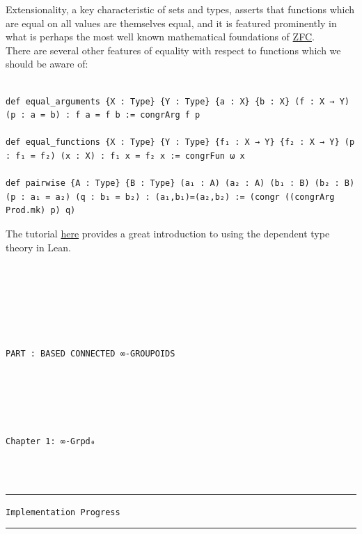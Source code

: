 \documentclass{book}
\theoremstyle{definition}
\newcounter{pcounter}
\newcounter{lcounter}
\renewcommand{\chapter}[1]{
\newpage
{
\Huge 
\begin{center}
\ \\
\ \\
\thispagestyle{empty}
\texttt{#1}
\end{center}}
\ \\
\ \\
}
\newcounter{partcount}
\renewcommand{\part}[1]{
\newpage
{
\Huge 
\begin{center}
\ \\
\ \\
\ \\
\ \\
\ \\
\ \\
\thispagestyle{empty}
\texttt{PART {\thepartcount}: #1}
\stepcounter{partcount}
\end{center}}
\ \\
\ \\
}
\begin{document}
Extensionality, a key characteristic of sets and types, asserts that functions which are equal on all values are themselves equal, and it is featured prominently in what is perhaps the most well known mathematical foundations of \href{https://encyclopediaofmath.org/wiki/ZFC}{ZFC}.\\

There are several other features of equality with respect to functions which we should be aware of:

\begin{center}
\begin{tcolorbox}[width=5in,colback={white},title={\begin{center}\texttt{Lean \thelcounter} \addtocounter{lcounter}{1}  \end{center}},colbacktitle=Blue,coltitle=black]
\begin{verbatim}

def equal_arguments {X : Type} {Y : Type} {a : X} {b : X} (f : X → Y) (p : a = b) : f a = f b := congrArg f p

def equal_functions {X : Type} {Y : Type} {f₁ : X → Y} {f₂ : X → Y} (p : f₁ = f₂) (x : X) : f₁ x = f₂ x := congrFun ω x

def pairwise {A : Type} {B : Type} (a₁ : A) (a₂ : A) (b₁ : B) (b₂ : B) (p : a₁ = a₂) (q : b₁ = b₂) : (a₁,b₁)=(a₂,b₂) := (congr ((congrArg Prod.mk) p) q)

\end{verbatim}
\end{tcolorbox}
\end{center}

The tutorial \href{https://leanprover.github.io/theorem_proving_in_lean4/}{here} provides a great introduction to using the dependent type theory in Lean.\\


\part{BASED CONNECTED ∞-GROUPOIDS}



\chapter{Chapter 1: ∞\texttt{-Grpd₀}}

\noindent\textcolor{Red}{\rule{16cm}{1mm}}
\begin{center}
\texttt{Implementation Progress}
\end{center}
\noindent\textcolor{Red}{\rule{16cm}{1mm}}
\end{document}
